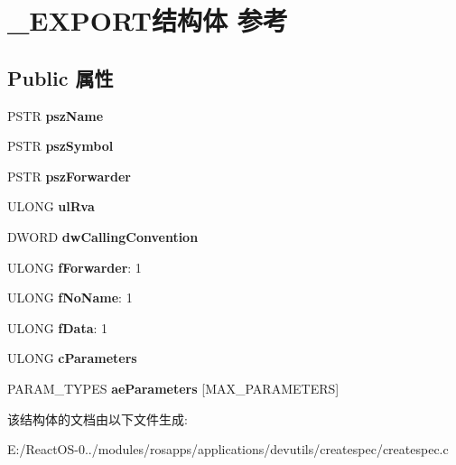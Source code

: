 \hypertarget{struct___e_x_p_o_r_t}{}\section{\+\_\+\+E\+X\+P\+O\+R\+T结构体 参考}
\label{struct___e_x_p_o_r_t}
\subsection*{Public 属性}
\begin{DoxyCompactItemize}
\item 
\mbox{\label{struct___e_x_p_o_r_t_a422fa5125924bc8ea9f56c244e663a95}} 
P\+S\+TR {\bfseries psz\+Name}
\item 
\mbox{\label{struct___e_x_p_o_r_t_a2a2a1d913db818c74015227b19cc40e4}} 
P\+S\+TR {\bfseries psz\+Symbol}
\item 
\mbox{\label{struct___e_x_p_o_r_t_a55d9de121c47c643504e7771d3298461}} 
P\+S\+TR {\bfseries psz\+Forwarder}
\item 
\mbox{\label{struct___e_x_p_o_r_t_a686eb1ae9d4554281826cceeff1b504d}} 
U\+L\+O\+NG {\bfseries ul\+Rva}
\item 
\mbox{\label{struct___e_x_p_o_r_t_a15d0e7ae89d22d1dda0a7763c972a60d}} 
D\+W\+O\+RD {\bfseries dw\+Calling\+Convention}
\item 
\mbox{\label{struct___e_x_p_o_r_t_a442dbd8f8f048d3e5f2d1b39d7cac177}} 
U\+L\+O\+NG {\bfseries f\+Forwarder}\+: 1
\item 
\mbox{\label{struct___e_x_p_o_r_t_a77e48d980ddab745719b123f47d139ec}} 
U\+L\+O\+NG {\bfseries f\+No\+Name}\+: 1
\item 
\mbox{\label{struct___e_x_p_o_r_t_a03bb0a0364239e3cabcbb6bf716e6bbb}} 
U\+L\+O\+NG {\bfseries f\+Data}\+: 1
\item 
\mbox{\label{struct___e_x_p_o_r_t_a9335715e519afae07e09f37d51dbafd9}} 
U\+L\+O\+NG {\bfseries c\+Parameters}
\item 
\mbox{\label{struct___e_x_p_o_r_t_a57824764c80666feec7c227566e9116f}} 
P\+A\+R\+A\+M\+\_\+\+T\+Y\+P\+ES {\bfseries ae\+Parameters} \mbox{[}M\+A\+X\+\_\+\+P\+A\+R\+A\+M\+E\+T\+E\+RS\mbox{]}
\end{DoxyCompactItemize}


该结构体的文档由以下文件生成\+:\begin{DoxyCompactItemize}
\item 
E\+:/\+React\+O\+S-\/0../modules/rosapps/applications/devutils/createspec/createspec.\+c\end{DoxyCompactItemize}
